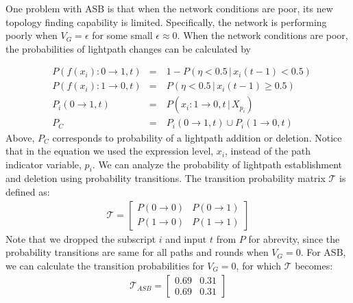 \documentclass[conference]{IEEEtran}
\begin{document}
One problem with ASB is that when the network conditions are poor, its new topology finding capability is limited.
Specifically, the network is performing poorly when $V_G = \epsilon$ for some small $\epsilon \approx 0$.
When the network conditions are poor, the probabilities of lightpath changes can be calculated by 
\par\nobreak \vspace{-0.24cm}
{\small \begin{align}
\label{probs2}
  &P(f(x_i):{0\rightarrow1}, t)& = \: &  1- P ( \eta < 0.5 \,|\, x_i(t-1)<0.5 ) \\
 &P(f(x_i):1\rightarrow0, t)& = \:&  P ( \eta < 0.5 \,|\, x_i(t-1)\geq 0.5 ) \\
&P_i(0\rightarrow 1, t) & =\: &   P(x_i:1\rightarrow0, t \,|\, X_{p_i} ) \\
&P_C & =\: &  P_i(0\rightarrow 1, t) \cup P_i(1\rightarrow 0, t) 
 \end{align}}Above, $P_C$ corresponds to probability of a lightpath addition or deletion.
Notice that in the equation we used the expression level, $x_i$, instead of the path indicator variable, $p_i$. We can analyze the probability of lightpath establishment and deletion using probability transitions.
The transition probability matrix $\mathcal{T}$ is defined as:
  \begin{align} 
\mathcal{T} =   \left[\begin{matrix} P(0\rightarrow 0) & P(0\rightarrow1)\\ P(1\rightarrow 0) & P(1\rightarrow1) \end{matrix} \right] 
\end{align}   
Note that we dropped the subscript $i$ and input $t$ from $P$ for abrevity, since the probability transitions are same for all paths and 
 rounds when $V_G=0$. For ASB,   we can calculate the transition probabilities for $V_G=0$, for which  $\mathcal{T}$ becomes: 
   \begin{align}\label{originalmat}
 \mathcal{T}_{ASB} =   \left[\begin{matrix} 0.69 & 0.31 \\ 0.69  &0.31 \end{matrix} \right] 
\end{align}  
 
\end{document}
